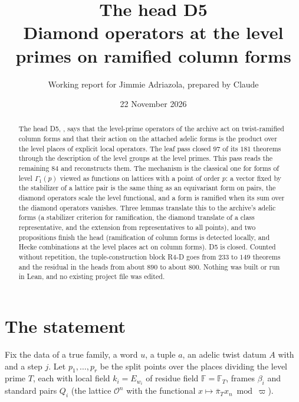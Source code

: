 \documentclass[11pt]{article}
\title{The head D5\\ Diamond operators at the level primes on ramified column forms}
\author{Working report for Jimmie Adriazola, prepared by Claude}
\date{22 November 2026}
\newcommand{\Ok}{\mathcal O}
\newcommand{\Fq}{\mathbb F}
\theoremstyle{definition}
\theoremstyle{remark}
\begin{document}
\maketitle

\begin{abstract}
The head D5, , says that the level-prime operators of the archive act on twist-ramified column forms and that their action on the attached adelic forms is the product over the level places of explicit local operators. The leaf pass closed $97$ of its $181$ theorems through the description of the level groups at the level primes. This pass reads the remaining $84$ and reconstructs them. The mechanism is the classical one for forms of level $\Gamma_1(p)$ viewed as functions on lattices with a point of order $p$: a vector fixed by the stabilizer of a lattice pair is the same thing as an equivariant form on pairs, the diamond operators scale the level functional, and a form is ramified when its sum over the diamond operators vanishes. Three lemmas translate this to the archive's adelic forms (a stabilizer criterion for ramification, the diamond translate of a class representative, and the extension from representatives to all points), and two propositions finish the head (ramification of column forms is detected locally, and Hecke combinations at the level places act on column forms). D5 is closed. Counted without repetition, the tuple-construction block R4-D goes from $233$ to $149$ theorems and the residual in the heads from about $890$ to about $800$. Nothing was built or run in Lean, and no existing project file was edited.
\end{abstract}

\section{The statement}

Fix the data of a true family, a word $u$, a tuple $a$, an adelic twist datum $A$ with  and a step $j$. Let $p_1,\dots,p_r$ be the split points over the places dividing the level prime $T$, each with local field $k_i=E_{w_i}$ of residue field $\Fq=\mathbb F_T$, frames $\beta_i$ and standard pairs $Q_i$ (the lattice $\Ok^{n}$ with the functional $x\mapsto\bar\pi_Tx_n\bmod\varpi$).
\end{document}
